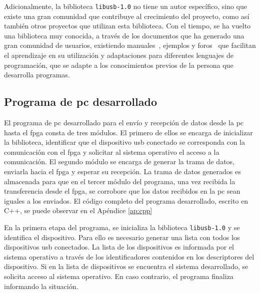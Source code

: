 	Adicionalmente, la biblioteca \verb|libusb-1.0| no tiene un autor específico, sino que existe una gran comunidad que contribuye al crecimiento del proyecto, como así también otros proyectos que utilizan esta biblioteca. Con el tiempo, se ha vuelto una biblioteca muy conocida, a través de los documentos que ha generado una gran comunidad de usuarios, existiendo manuales~\cite{libusb}, ejemplos y foros~\cite{ThePersianCoder2010} que facilitan el aprendizaje en su utilización y adaptaciones para diferentes lenguajes de programación, que se adapte a los conocimientos previos de la persona que desarrolla programas.

\subsection{Programa de \acrshort{pc} desarrollado}
	El programa de \acrshort{pc} desarrollado para el envío y recepción de datos desde la \acrshort{pc} hasta el \acrshort{fpga} consta de tres módulos. El primero de ellos se encarga de inicializar la biblioteca, identificar que el dispositivo \acrshort{usb} conectado se corresponda con la comunicación con el \acrshort{fpga} y solicitar al sistema operativo el acceso a la comunicación.
	El segundo módulo se encarga de generar la trama de datos, enviarla hacia el \acrshort{fpga} y esperar su recepción. La trama de datos generados es almacenada para que en el tercer módulo del programa, una vez recibida la transferencia desde el \acrshort{fpga}, se corrobore que los datos recibidos en la \acrshort{pc} sean iguales a los enviados. El código completo del programa desarrollado, escrito en C++, se puede observar en el Apéndice \ref{ap:cpp}
	
	En la primera etapa del programa, se inicializa la biblioteca \verb|libusb-1.0| y se identifica el dispositivo. Para ello es necesario generar una lista con todos los dispositivos \acrshort{usb} conectados.
	La lista de los dispositivos es informada por el sistema operativo a través de los identificadores contenidos en los descriptores del dispositivo. Si en la lista de dispositivos se encuentra el sistema desarrollado, se solicita acceso al sistema operativo. En caso contrario, el programa finaliza informando la situación.
	

